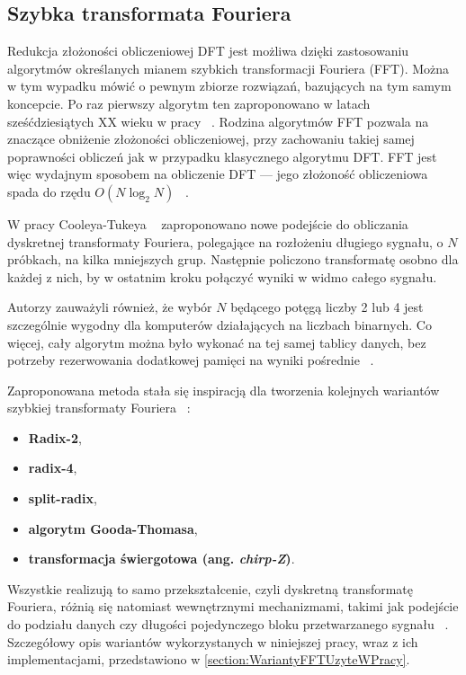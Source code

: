\subsection{Szybka transformata Fouriera}
Redukcja złożoności obliczeniowej DFT jest możliwa dzięki zastosowaniu algorytmów określanych mianem szybkich transformacji Fouriera (FFT). Można w tym wypadku mówić o pewnym zbiorze rozwiązań, bazujących na tym samym koncepcie. Po raz pierwszy algorytm ten zaproponowano w latach sześćdziesiątych XX wieku w pracy ~\cite{CooleyTurkeyFFT}. Rodzina algorytmów FFT pozwala na znaczące obniżenie złożoności obliczeniowej, przy zachowaniu takiej samej poprawności obliczeń jak w przypadku klasycznego algorytmu DFT. FFT jest więc wydajnym sposobem na obliczenie DFT — jego złożoność obliczeniowa spada do rzędu $O(N\log_2 N)$ ~\cite{ZielinskiDSP}.

W pracy Cooleya-Tukeya ~\cite{CooleyTurkeyFFT} zaproponowano nowe podejście do obliczania dyskretnej transformaty Fouriera, polegające na rozłożeniu długiego sygnału, o $N$ próbkach, na kilka mniejszych grup. Następnie policzono transformatę osobno dla każdej z nich, by w ostatnim kroku połączyć wyniki w widmo całego sygnału.

Autorzy zauważyli również, że wybór $N$ będącego potęgą liczby 2 lub 4 jest szczególnie wygodny dla komputerów działających na liczbach binarnych. Co więcej, cały algorytm można było wykonać na tej samej tablicy danych, bez potrzeby rezerwowania dodatkowej pamięci na wyniki pośrednie ~\cite{CooleyTurkeyFFT}.

Zaproponowana metoda stała się inspiracją dla tworzenia kolejnych wariantów szybkiej transformaty Fouriera ~\cite{ZielinskiDSP}:

\begin{itemize}
    \item \textbf{Radix-2},
    \item \textbf{radix-4},
    \item \textbf{split-radix},
    \item \textbf{algorytm Gooda-Thomasa},
    \item \textbf{transformacja świergotowa (ang. \textit{chirp-Z})}.
\end{itemize}
Wszystkie realizują to samo przekształcenie, czyli dyskretną transformatę Fouriera, różnią się natomiast wewnętrznymi mechanizmami, takimi jak podejście do podziału danych czy długości pojedynczego bloku przetwarzanego sygnału ~\cite{ZielinskiDSP}.
Szczegółowy opis wariantów wykorzystanych w niniejszej pracy, wraz z ich implementacjami, przedstawiono w \cref{section:WariantyFFTUzyteWPracy}.

